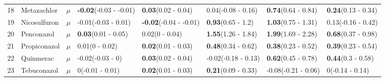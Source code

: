 \begin{longtable}{lp{2cm}p{0.7cm}p{2cm}p{2cm}p{2cm}p{2cm}p{2cm}}
  18 & Metazachlor & $\mu$ & \textbf{-0.02}\newline (-0.03 - -0.01) & \textbf{0.03}\newline (0.02 - 0.04) & 0.04\newline (-0.08 - 0.16) & \textbf{0.74}\newline (0.64 - 0.84) & \textbf{0.24}\newline (0.13 - 0.34) \\ 
  19 & Nicosulfuron & $\mu$ & -0.01\newline (-0.03 - 0.01) & \textbf{-0.02}\newline (-0.04 - -0.01) & \textbf{0.93}\newline (0.65 - 1.2) & \textbf{1.03}\newline (0.75 - 1.31) & 0.13\newline (-0.16 - 0.42) \\ 
  20 & Penconazol & $\mu$ & \textbf{0.03}\newline (0.01 - 0.05) & 0.02\newline (0 - 0.04) & \textbf{1.55}\newline (1.26 - 1.84) & \textbf{1.99}\newline (1.69 - 2.28) & \textbf{0.68}\newline (0.37 - 0.98) \\ 
  21 & Propiconazol & $\mu$ & 0.01\newline (0 - 0.02) & \textbf{0.02}\newline (0.01 - 0.03) & \textbf{0.48}\newline (0.34 - 0.62) & \textbf{0.38}\newline (0.23 - 0.52) & \textbf{0.39}\newline (0.23 - 0.54) \\ 
  22 & Quinmerac & $\mu$ & -0.02\newline (-0.03 - 0) & \textbf{0.03}\newline (0.02 - 0.04) & -0.02\newline (-0.18 - 0.13) & \textbf{0.62}\newline (0.45 - 0.78) & \textbf{0.44}\newline (0.3 - 0.58) \\ 
  23 & Tebuconazol & $\mu$ & 0\newline (-0.01 - 0.01) & \textbf{0.02}\newline (0.01 - 0.03) & \textbf{0.21}\newline (0.09 - 0.33) & -0.08\newline (-0.21 - 0.06) & 0\newline (-0.14 - 0.14) \\ 

\end{longtable}

